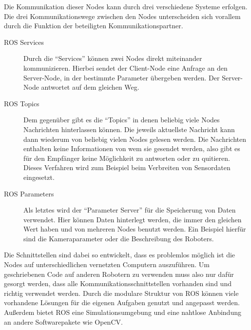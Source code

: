 Die Kommunikation dieser Nodes kann durch drei verschiedene Systeme erfolgen.
Die drei Kommunikationswege zwischen den Nodes unterscheiden sich vorallem
durch die Funktion der beteiligten Kommunikationspartner. 

\begin{description}

  \item[\ac{ROS} Services] Durch die
    ``Services'' können zwei Nodes direkt miteinander kommunizieren. Hierbei
    sendet der Client-Node eine Anfrage an den Server-Node, in der bestimmte
    Parameter übergeben werden. Der Server-Node antwortet auf dem gleichen
    Weg.


  \item[\ac{ROS} Topics]Dem gegenüber gibt es die ``Topics'' in denen beliebig
    viele Nodes Nachrichten hinterlassen können. Die jeweils aktuellste
    Nachricht kann dann wiederum von beliebig vielen Nodes gelesen werden. Die
    Nachrichten enthalten keine Informationen von wem sie gesendet werden, also
    gibt es für den Empfänger keine Möglichkeit zu antworten oder zu quitieren.
    Dieses Verfahren wird zum Beispiel beim Verbreiten von Sensordaten
    eingesetzt.


  \item[\ac{ROS} Parameters]Als letztes wird der ``Parameter Server'' für die
    Speicherung von Daten verwendet. Hier können Daten hinterlegt werden, die
    immer den gleichen Wert haben und von mehreren Nodes benutzt werden. Ein
    Beispiel hierfür sind die Kameraparameter oder die Beschreibung des
    Roboters. 

\end{description}

Die Schnittstellen sind dabei so entwickelt, dass es problemlos möglich ist die
Nodes auf unterschiedlichen vernetzten Computern auszuführen.  Um geschriebenen
Code auf anderen Robotern zu verwenden muss also nur dafür gesorgt werden, dass
alle Kommunikationsschnittstellen vorhanden sind und richtig verwendet werden.
Durch die modulare Struktur von \ac{ROS} können viele vorhandene Lösungen für
die eigenen Aufgaben genutzt und angepasst werden.  Außerdem bietet \ac{ROS}
eine Simulationsumgebung und eine nahtlose Anbindung an andere Softwarepakete
wie OpenCV.

\begin{figure}[htbp]




\end{figure}


